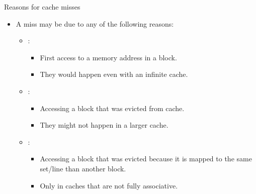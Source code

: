 \begin{frame}[t]{Reasons for cache misses}
\begin{itemize}
  \item A miss may be due to any of the following reasons:

    \begin{itemize}
    
      \item {}:
        \begin{itemize}
          \item First access to a memory address in a block.
          \item They would happen even with an infinite cache.
        \end{itemize}

      \item {}:
        \begin{itemize}
          \item Accessing a block that was evicted from cache.
          \item They might not happen in a larger cache.
        \end{itemize}

      \item {}:
        \begin{itemize}
          \item Accessing a block that was evicted because 
                it is mapped to the same set/line than another block.
          \item Only in caches that are not fully associative.
        \end{itemize}
    \end{itemize}
\end{itemize}
\end{frame}


